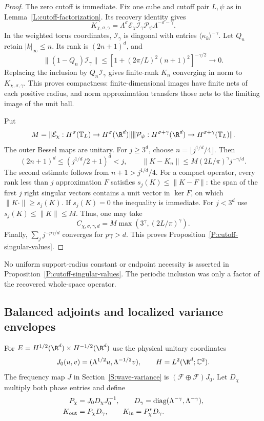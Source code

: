 \begin{proof}
  The zero cutoff is immediate. Fix one cube and cutoff pair $L,\psi$ as
  in Lemma~\ref{L:cutoff-factorization}. Its recovery identity gives
  \[
    K_{\chi,\sigma,\gamma}
    =\Lambda^\sigma\mathcal E_\chi\mathcal I_\gamma
    \mathcal P_\psi\Lambda^{-\sigma-\gamma}.
  \]
  In the weighted torus coordinates, $\mathcal I_\gamma$ is diagonal with
  entries $\langle\kappa_k\rangle^{-\gamma}$. Let $Q_n$ retain
  $|k|_\infty\le n$. Its rank is $(2n+1)^d$, and
  \[
    \|(1-Q_n)\mathcal I_\gamma\|
    \le [1+(2\pi/L)^2(n+1)^2]^{-\gamma/2}\longrightarrow0.
  \]
  Replacing the inclusion by $Q_n\mathcal I_\gamma$ gives finite-rank
  $K_n$ converging in norm to $K_{\chi,\sigma,\gamma}$. This proves
  compactness: finite-dimensional images have finite nets of each positive
  radius, and norm approximation transfers those nets to the limiting image
  of the unit ball.

  Put
  \[
    M=\|\mathcal E_\chi:H^\sigma(\mathbb T_L)\to H^\sigma(\R^d)\|
    \|\mathcal P_\psi:H^{\sigma+\gamma}(\R^d)
    \to H^{\sigma+\gamma}(\mathbb T_L)\|.
  \]
  The outer Bessel maps are unitary. For $j \ge 3^d$, choose
  $n=\lfloor j^{1/d}/4\rfloor$. Then
  \[
    (2n+1)^d\le(j^{1/d}/2+1)^d<j,\qquad
    \|K-K_n\|\le M(2L/\pi)^\gamma j^{-\gamma/d}.
  \]
  The second estimate follows from $n+1>j^{1/d}/4$. For a compact
  operator, every rank less than $j$ approximation $F$ satisfies
  $s_j(K)\le\|K-F\|$: the span of the first $j$ right singular vectors
  contains a unit vector in $\ker F$, on which $\|K\cdot\|\ge s_j(K)$.
  If $s_j(K)=0$ the inequality is immediate. For $j<3^d$ use
  $s_j(K)\le\|K\|\le M$. Thus, one may take
  \[
    C_{\chi,\sigma,\gamma,d}
    =M\max(3^\gamma,(2L/\pi)^\gamma).
  \]
  Finally, $\sum_j j^{-p\gamma/d}$ converges for $p\gamma>d$.
  This proves Proposition~\ref{P:cutoff-singular-values}.
\end{proof}

No uniform support-radius constant or endpoint necessity is asserted in
Proposition~\ref{P:cutoff-singular-values}. The periodic inclusion was only
a factor of the recovered whole-space operator.

\subsection{Balanced adjoints and localized variance envelopes}

For $E=H^{1/2}(\R^d)\times H^{-1/2}(\R^d)$ use the physical unitary
coordinates
\[
  J_0(u,v)=(\Lambda^{1/2}u,\Lambda^{-1/2}v),\qquad
  H=L^2(\R^d;\mathbb C^2).
\]
The frequency map $J$ in Section~\ref{S:wave-variance} is
$(\mathcal F\oplus\mathcal F)J_0$. Let $D_\chi$ multiply both phase
entries and define
\begin{align}
  P_\chi&=J_0D_\chi J_0^{-1},\qquad
  D_\gamma=\operatorname{diag}(\Lambda^{-\gamma},\Lambda^{-\gamma}),
  \label{E:compact-balanced-cutoff}\\
  K_{\rm out}&=P_\chi D_\gamma,\qquad
  K_{\rm in}=P_\chi^*D_\gamma.
  \label{E:compact-two-factors}
\end{align}

